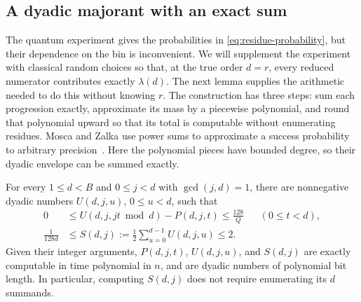 \subsection{A dyadic majorant with an exact sum}

The quantum experiment gives the probabilities in
\eqref{eq:residue-probability}, but their dependence on the bin is inconvenient.
We will supplement the experiment with classical random choices so that, at
the true order \(d=r\), every reduced numerator contributes exactly
\(\lambda(d)\).  The next lemma supplies the arithmetic needed to do this
without knowing \(r\). The construction has three steps: sum each
progression exactly, approximate its mass by a piecewise polynomial, and
round that polynomial upward so that its total is computable without
enumerating residues. Mosca and Zalka use power sums to approximate a
success probability to arbitrary precision~\cite[Section~4.1]{MZ}.
Here the polynomial pieces have bounded degree, so their dyadic envelope
can be summed exactly.

\begin{lemma}\label{lem:majorant}
For every \(1\le d<B\) and \(0\le j<d\) with \(\gcd(j,d)=1\), there are
nonnegative dyadic numbers \(U(d,j,u)\), \(0\le u<d\), such that
\begin{align}
 0&\le U(d,j,jt\bmod d)-P(d,j,t)\le \frac{128}{Q}
       &&(0\le t<d), \label{majorant-error}\\
 \frac{1}{128d}&\le
 S(d,j):=\frac12\sum_{u=0}^{d-1}U(d,j,u)\le2.
 \label{majorant-sum}
\end{align}
Given their integer arguments, \(P(d,j,t)\), \(U(d,j,u)\), and \(S(d,j)\)
are exactly computable in time polynomial in \(n\), and are dyadic numbers
of polynomial bit length.  In particular, computing \(S(d,j)\) does not
require enumerating its \(d\) summands.
\end{lemma}

